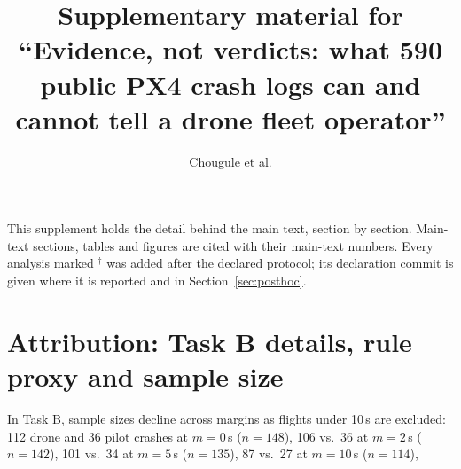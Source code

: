 \documentclass[preprint,12pt]{elsarticle}
\begin{document}
\begin{frontmatter}
\title{Supplementary material for ``Evidence, not verdicts: what 590 public PX4 crash logs can and cannot tell a drone fleet operator''}
\author{Chougule et al.}
\end{frontmatter}

This supplement holds the detail behind the main text, section by section. Main-text sections, tables and figures are cited with their main-text numbers. Every analysis marked $^\dagger$ was added after the declared protocol; its declaration commit is given where it is reported and in Section~\ref{sec:posthoc}.

\section{Attribution: Task B details, rule proxy and sample size}
\label{sup:attribution}
In Task B, sample sizes decline across margins as flights under 10\,s are excluded: 112 drone and 36 pilot crashes
at $m=0$\,s ($n=148$), 106 vs.\ 36 at $m=2$\,s ($n=142$), 101 vs.\ 34 at $m=5$\,s ($n=135$), 87 vs.\ 27 at $m=10$\,s ($n=114$),
\end{document}
